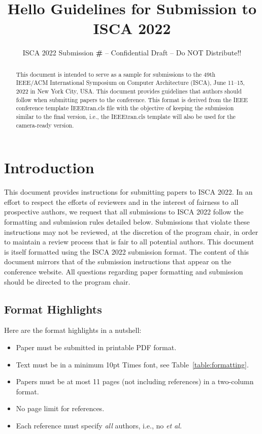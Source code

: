 \documentclass[conference]{IEEEtran}
\title{Hello Guidelines for Submission to ISCA 2022}
\author{\normalsize{ISCA 2022 Submission
    \textbf{\#\iscasubmissionnumber} -- Confidential Draft -- Do NOT Distribute!!}}
\begin{document}
\maketitle
\thispagestyle{plain}
\pagestyle{plain}




\begin{abstract}

This document is intended to serve as a sample for submissions to the
49th IEEE/ACM International Symposium on Computer Architecture (ISCA),
June 11--15, 2022 in New York City, USA. This document provides
guidelines that authors should follow when submitting papers to the
conference. This format is derived from the IEEE conference template IEEEtran.cls
file with the objective of keeping the submission similar to the final
version, i.e., the IEEEtran.cls template will also be used for
the camera-ready version.

\end{abstract}

\section{Introduction}

This document provides instructions for submitting papers to ISCA
2022. In an effort to respect the efforts of reviewers and in the
interest of fairness to all prospective authors, we request that all
submissions to ISCA 2022 follow the formatting and submission rules
detailed below. Submissions that violate these instructions may not be
reviewed, at the discretion of the program chair, in order to
maintain a review process that is fair to all potential authors. This
document is itself formatted using the ISCA 2022 submission format. The
content of this document mirrors that of the submission instructions
that appear on the conference website. All questions regarding paper
formatting and submission should be directed to the program chair.

\subsection{Format Highlights}

Here are the format highlights in a nutshell:
\begin{itemize}
\item Paper must be submitted in printable PDF format.
\item Text must be in a minimum 10pt Times font, see Table~\ref{table:formatting}.
\item Papers must be at most 11 pages (not including references) in a
  two-column format.
\item No page limit for references.
\item Each reference must specify {\em all} authors, i.e., no {\em et al.}
\end{itemize}
\end{document}
